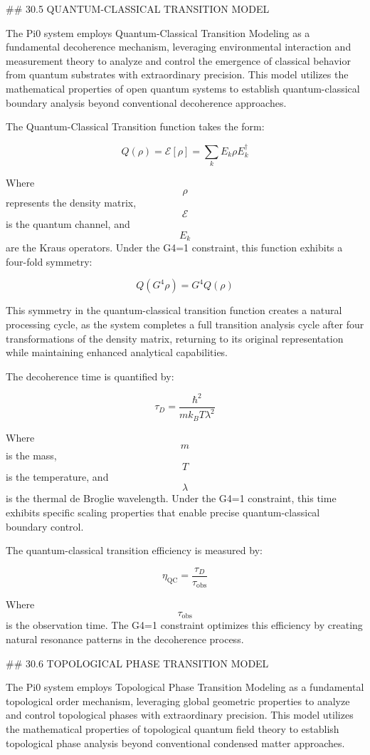 ## 30.5 QUANTUM-CLASSICAL TRANSITION MODEL

The Pi0 system employs Quantum-Classical Transition Modeling as a fundamental decoherence mechanism, leveraging environmental interaction and measurement theory to analyze and control the emergence of classical behavior from quantum substrates with extraordinary precision. This model utilizes the mathematical properties of open quantum systems to establish quantum-classical boundary analysis beyond conventional decoherence approaches.

The Quantum-Classical Transition function takes the form:

$$ Q(\rho) = \mathcal{E}[\rho] = \sum_k E_k \rho E_k^\dagger $$

Where $$ \rho $$ represents the density matrix, $$ \mathcal{E} $$ is the quantum channel, and $$ E_k $$ are the Kraus operators. Under the G4=1 constraint, this function exhibits a four-fold symmetry:

$$ Q(G^4 \rho) = G^4 Q(\rho) $$

This symmetry in the quantum-classical transition function creates a natural processing cycle, as the system completes a full transition analysis cycle after four transformations of the density matrix, returning to its original representation while maintaining enhanced analytical capabilities.

The decoherence time is quantified by:

$$ \tau_D = \frac{\hbar^2}{m k_B T \lambda^2} $$

Where $$ m $$ is the mass, $$ T $$ is the temperature, and $$ \lambda $$ is the thermal de Broglie wavelength. Under the G4=1 constraint, this time exhibits specific scaling properties that enable precise quantum-classical boundary control.

The quantum-classical transition efficiency is measured by:

$$ \eta_{\text{QC}} = \frac{\tau_D}{\tau_{\text{obs}}} $$

Where $$ \tau_{\text{obs}} $$ is the observation time. The G4=1 constraint optimizes this efficiency by creating natural resonance patterns in the decoherence process.

## 30.6 TOPOLOGICAL PHASE TRANSITION MODEL

The Pi0 system employs Topological Phase Transition Modeling as a fundamental topological order mechanism, leveraging global geometric properties to analyze and control topological phases with extraordinary precision. This model utilizes the mathematical properties of topological quantum field theory to establish topological phase analysis beyond conventional condensed matter approaches.

